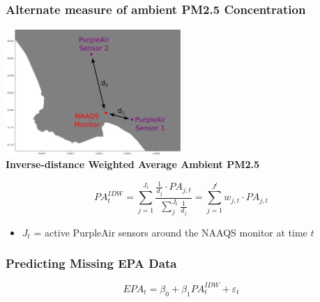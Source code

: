 \documentclass{beamer}
\begin{document}
\begin{frame}
\frametitle{Alternate measure of ambient PM2.5 Concentration}

\hspace{7em}
\includegraphics[width=0.5\textwidth]{output/figures/diagrams/IDW_diagram.png}
\\
\textbf{Inverse-distance Weighted Average Ambient PM2.5}

\begin{equation*}
    PA^{IDW}_t= \sum\limits_{j=1}^{J_t} \dfrac{\frac{1}{d_j}\cdot PA_{j,t}}{\sum\limits_j^{J_t}\frac{1}{d_j}}
    = \sum\limits_{j=1}^{J^t} w_{j,t}\cdot PA_{j,t}
\end{equation*}
\begin{itemize}
    \item $J_t$ = active PurpleAir sensors around the NAAQS monitor at time $t$
\end{itemize}

\end{frame}


\begin{frame}
\frametitle{Predicting Missing EPA Data}
\begin{equation*}
EPA_t = \beta_0 + \beta_1 PA^{IDW}_t + \varepsilon_t
\end{equation*}


\end{frame}
\end{document}
